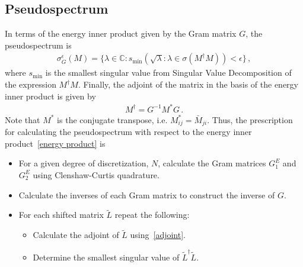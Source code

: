 \documentclass[11pt,letterpaper]{article}
\begin{document}
\subsection{Pseudospectrum}

In terms of the energy inner product given by the Gram matrix $G$, the pseudospectrum is
\begin{align}
	\sigma^\epsilon_G(M) = \{\lambda \in \mathbb{C}: s_{\text{min}} \left( \sqrt{\lambda}: \lambda \in \sigma(M^\dagger M) \right) < \epsilon \} \, ,
\end{align}
where $s_{\text{min}}$ is the smallest singular value from Singular Value Decomposition of the expression $M^\dagger M$. Finally, the adjoint of the matrix in the basis of the energy inner product is given by
\begin{align}
	\label{adjoint}
	M^\dagger = G^{-1} M^* G \, .
\end{align}
Note that $M^*$ is the conjugate transpose, i.e. $M^*_{ij} = \bar M_{ji}$. Thus, the prescription for calculating the pseudospectrum with respect to the energy inner product~\eqref{energy product} is
\begin{itemize}
	\item For a given degree of discretization, $N$, calculate the Gram matrices $G^E_1$ and $G^E_2$ using Clenshaw-Curtis quadrature.
	\item Calculate the inverses of each Gram matrix to construct the inverse of $G$.
	\item For each shifted matrix $\tilde L$ repeat the following:
		\begin{itemize}
			\item Calculate the adjoint of $\tilde L$ using~\eqref{adjoint}.
			\item Determine the smallest singular value of $\tilde L^\dagger \tilde L$.
		\end{itemize}
\end{itemize}
\end{document}
